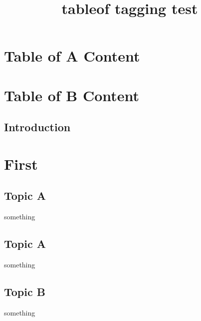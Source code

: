 \documentclass{book}
\title{tableof tagging test}
\begin{document}
\tableofcontents
\chapter*{Table of A Content}
\chapter*{Table of B Content}

\newpage
\section{Introduction}

\chapter{First}
\section{Topic A}
something
\section{Topic A}
something
\section{Topic B}
something
\end{document}
